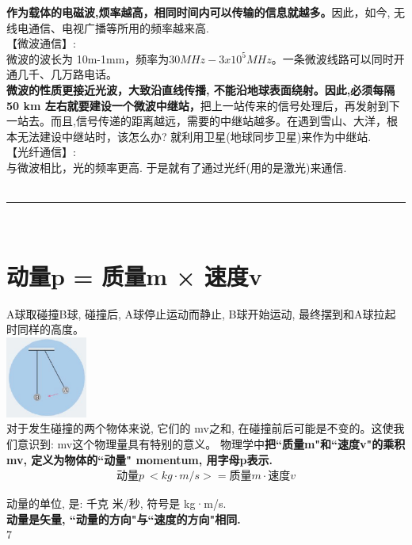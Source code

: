 \documentclass[UTF8]{ctexart}
\begin{document}
		\textbf{作为载体的电磁波,烦率越高，相同时间内可以传输的信息就越多。}因此，如今, 无线电通信、电视广播等所用的频率越来高.\\
		
		
		【微波通信】:\\
		微波的波长为 10m-1mm，频率为$30 MHz - 3x10^5 MHz$。一条微波线路可以同时开通几千、几万路电话。\\
		\textbf{微波的性质更接近光波，大致沿直线传播, 不能沿地球表面绕射。因此,必须每隔 50 km 左右就要建设一个微波中继站，}把上一站传来的信号处理后，再发射到下一站去。而且,信号传递的距离越远，需要的中继站越多。在遇到雪山、大洋，根本无法建设中继站时，该怎么办? 就利用卫星(地球同步卫星)来作为中继站. \\
		
		
		【光纤通信】:\\
		与微波相比，光的频率更高. 于是就有了通过光纤(用的是激光)来通信.\\
		
		~\\
		\hrule
		~\\
		
\section{动量p = 质量m × 速度v}

A球取碰撞B球, 碰撞后, A球停止运动而静止, B球开始运动, 最终摆到和A球拉起时同样的高度。 \\
\includegraphics[width=0.2\textwidth]{img/0103.png} \\

对于发生碰撞的两个物体来说, 它们的 mv之和, 在碰撞前后可能是不变的。这使我们意识到: mv这个物理量具有特别的意义。
物理学中\textbf{把``质量m"和``速度v"的乘积mv, 定义为物体的``动量" momentum, 用字母p表示.} 
\begin{align*}
	\boxed{
\text{动量}p\ <kg·m/s>=\text{质量}m\cdot \text{速度}v
	}
\end{align*}

动量的单位, 是: 千克 米/秒, 符号是 kg·m/s. \\
\textbf{动量是矢量, ``动量的方向"与``速度的方向"相同.}\\





7



		
		
	
	
\end{document}
